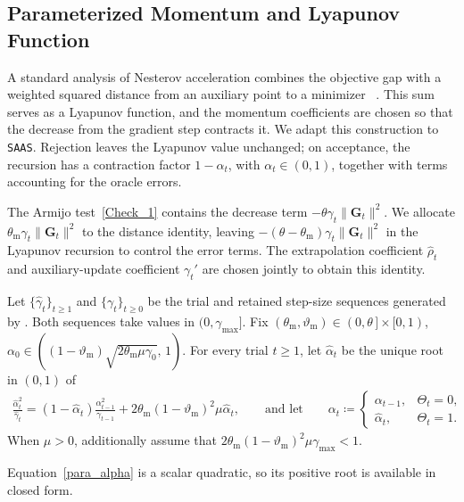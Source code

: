 \documentclass{article}
\begin{document}
\subsection{Parameterized Momentum and Lyapunov Function}
\label{subsection_momentum strategy}
A standard analysis of Nesterov acceleration combines the objective gap with a weighted squared distance from an auxiliary point to a minimizer~
\cite{Nestrov2014book,localLip}. 
This sum serves as a Lyapunov function, and the momentum coefficients are chosen so that the decrease from the gradient step contracts it. We adapt this construction to  \texttt{SAAS}. Rejection leaves the Lyapunov value unchanged; on acceptance, the recursion has a contraction factor $1-\alpha_t$, with $\alpha_t\in(0,1)$, together with terms accounting for the oracle errors.

The Armijo test~\eqref{Check_1} contains the decrease term
\(-\theta\gamma_t\|\mathbf G_t\|^2\). We allocate \(\theta_{\mathrm m}\gamma_t\|\mathbf G_t\|^2\)
to the distance identity,
leaving
\(-(\theta-\theta_{\mathrm m})\gamma_t\|\mathbf G_t\|^2\)
in the Lyapunov recursion to control the error terms.  The extrapolation coefficient \(\hat\rho_t\) and auxiliary-update
coefficient \(\gamma_t'\) are chosen jointly to obtain this identity.

\begin{definition}
\label{para}Let \(\{\hat\gamma_t\}_{t\ge1}\) and
\(\{\gamma_t\}_{t\ge0}\) be the trial and retained step-size
sequences generated by . Both sequences take values
in \((0,\gamma_{\max}]\).
Fix
\((\theta_{\mathrm{m}},\vartheta_{\mathrm{m}})
\in(0,\theta\,]\times[0,1)\), 
\(
\alpha_0\in\left(
(1-\vartheta_{\mathrm{m}})
\sqrt{2\theta_{\mathrm{m}}\mu\gamma_0},
\,1
\right)
\).
For every trial \(t\ge1\), let \(\hat\alpha_t\) be the unique root in
\((0,1)\) of
\begin{align}\label{para_alpha}
\frac{\hat\alpha_t^2}{\hat\gamma_t}
=
(1-\hat\alpha_t)
\frac{\alpha_{t-1}^2}{\gamma_{t-1}}
+
2\theta_{\mathrm{m}}(1-\vartheta_{\mathrm{m}})^2
\mu\hat\alpha_t,
\qquad \text{and let}\qquad
\alpha_t\coloneqq 
\begin{cases}
\alpha_{t-1}, & \Theta_t=0,\\
\hat\alpha_t, & \Theta_t=1.
\end{cases}
\end{align}
When \(\mu>0\), additionally assume that
$2\theta_{\mathrm{m}}(1-\vartheta_{\mathrm{m}})^2
\mu\gamma_{\max}<1$.
\end{definition}
Equation~\eqref{para_alpha} is a scalar quadratic, so its positive root
is available in closed form.
\end{document}
